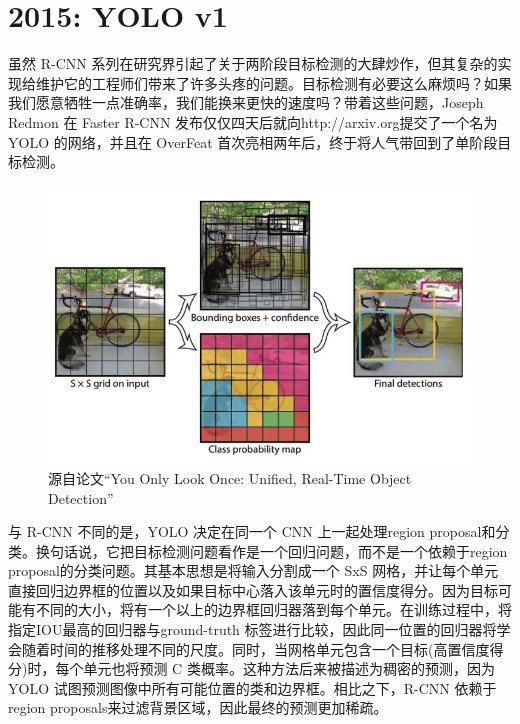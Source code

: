 \documentclass{article}
\begin{document}
	   	\section{2015: YOLO v1}
	   	虽然 R-CNN 系列在研究界引起了关于两阶段目标检测的大肆炒作，但其复杂的实现给维护它的工程师们带来了许多头疼的问题。目标检测有必要这么麻烦吗？如果我们愿意牺牲一点准确率，我们能换来更快的速度吗？带着这些问题，Joseph Redmon 在 Faster R-CNN 发布仅仅四天后就向http://arxiv.org提交了一个名为 YOLO 的网络，并且在 OverFeat 首次亮相两年后，终于将人气带回到了单阶段目标检测。
	   	
	   	\begin{figure}[htpb]
	   		\centering
	   		\includegraphics[width=\linewidth]{detectfig/5.jpg}
	   		\caption{源自论文“You Only Look Once: Unified, Real-Time Object Detection”}
	   	\end{figure}
	   	
	   	与 R-CNN 不同的是，YOLO 决定在同一个 CNN 上一起处理region proposal和分类。换句话说，它把目标检测问题看作是一个回归问题，而不是一个依赖于region proposal的分类问题。其基本思想是将输入分割成一个 SxS 网格，并让每个单元直接回归边界框的位置以及如果目标中心落入该单元时的置信度得分。因为目标可能有不同的大小，将有一个以上的边界框回归器落到每个单元。在训练过程中，将指定IOU最高的回归器与ground-truth 标签进行比较，因此同一位置的回归器将学会随着时间的推移处理不同的尺度。同时，当网格单元包含一个目标(高置信度得分)时，每个单元也将预测 C 类概率。这种方法后来被描述为稠密的预测，因为 YOLO 试图预测图像中所有可能位置的类和边界框。相比之下，R-CNN 依赖于region proposals来过滤背景区域，因此最终的预测更加稀疏。
	   	
\end{document}
